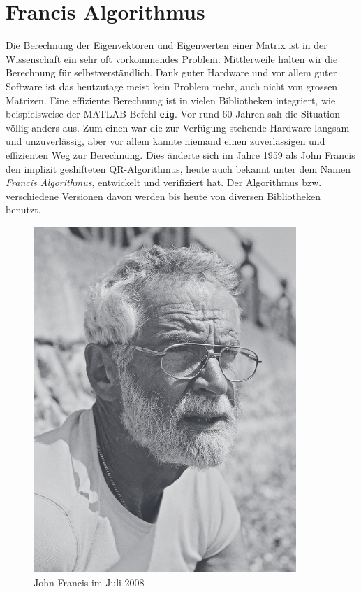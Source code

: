 \newcommand{\norm}[1]{\left\lVert#1\right\rVert}


\chapter{Francis Algorithmus\label{chapter:francis}}
\begin{refsection}

Die Berechnung der Eigenvektoren und Eigenwerten einer Matrix ist in der Wissenschaft ein sehr oft vorkommendes Problem.
Mittlerweile halten wir die Berechnung für selbstverständlich.
Dank guter Hardware und vor allem guter Software ist das heutzutage meist kein Problem mehr, auch nicht von grossen Matrizen.
Eine effiziente Berechnung ist in vielen Bibliotheken integriert, wie beispielsweise der MATLAB-Befehl \texttt{eig}.
Vor rund 60 Jahren sah die Situation völlig anders aus.
Zum einen war die zur Verfügung stehende Hardware langsam und unzuverlässig, aber vor allem kannte niemand einen zuverlässigen und effizienten Weg zur Berechnung.
Dies änderte sich im Jahre 1959 als John Francis den implizit geshifteten QR-Algorithmus, heute auch bekannt unter dem Namen \emph{Francis Algorithmus}, entwickelt und verifiziert hat.
Der Algorithmus bzw. verschiedene Versionen davon werden bis heute von diversen Bibliotheken benutzt. \cite{francis:watkins_paper}

\begin{figure}[h]
	\begin{center}
		\includegraphics[scale=0.5]{papers/francis/images/Francis.png}
		\caption{John Francis im Juli 2008 \cite{francis:francis_portrait}}
		\label{John Francis}
	\end{center}
\end{figure}



\end{refsection}
